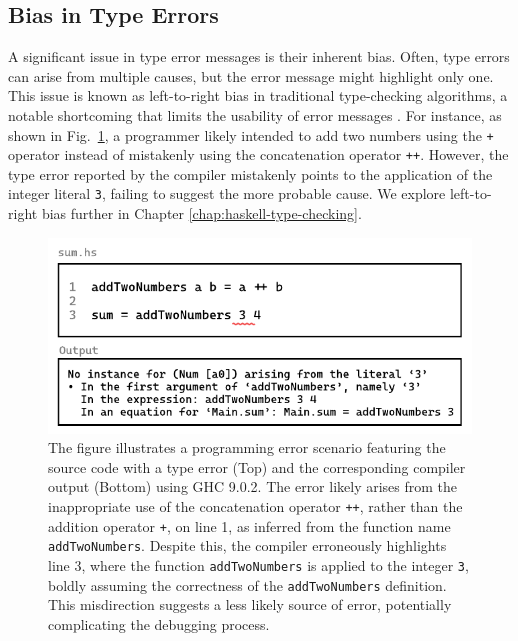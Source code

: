  \subsection*{Bias in Type Errors} 
 \label{subsec:bias}
 
A significant issue in type error messages is their inherent bias. Often, type errors can arise from multiple causes, but the error message might highlight only one. This issue is known as left-to-right bias in traditional type-checking algorithms, a notable shortcoming that limits the usability of error messages \cite{McAdam2002-vb, Lee1998-fx, Chen2014-ev}.  For instance, as shown in Fig.~\ref{fig:type-error-example}, a programmer likely intended to add two numbers using the \texttt{+} operator instead of mistakenly using the concatenation operator \texttt{++}. However, the type error reported by the compiler mistakenly points to the application of the integer literal \texttt{3}, failing to suggest the more probable cause. We explore left-to-right bias further in Chapter \ref{chap:haskell-type-checking}.

 \begin{figure}[htbp]
  \centering
  \includegraphics[width=\linewidth]{TypeErrorExample}
  \caption[Illustrating a programming error in Haskell, featuring a function named \texttt{addTwoNumbers} with a type error and the corresponding compiler output]{
    \label{fig:type-error-example}
    The figure illustrates a programming error scenario featuring the source code with a type error (Top) and the corresponding compiler output (Bottom) using GHC 9.0.2. The error likely arises from the inappropriate use of the concatenation operator \texttt{++}, rather than the addition operator \texttt{+}, on line 1, as inferred from the function name \texttt{addTwoNumbers}. Despite this, the compiler erroneously highlights line 3, where the function \texttt{addTwoNumbers} is applied to the integer \texttt{3}, boldly assuming the correctness of the \texttt{addTwoNumbers} definition. This misdirection suggests a less likely source of error, potentially complicating the debugging process.
    }
\end{figure}


